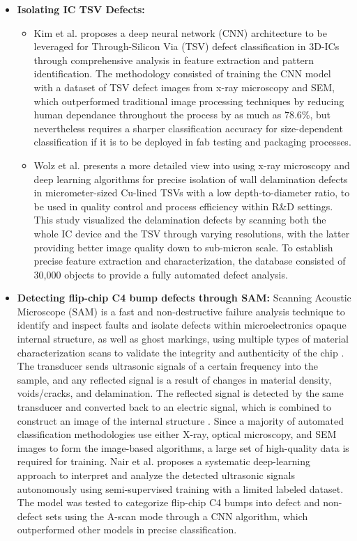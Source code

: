 \begin{itemize}
    \item \textbf{Isolating IC TSV Defects:}
    \begin{itemize}
    \item Kim et al. \cite{Kim2018DeepLB} proposes a deep neural network (CNN) architecture to be leveraged for Through-Silicon Via (TSV) defect classification in 3D-ICs through comprehensive analysis in feature extraction and pattern identification. The methodology consisted of training the CNN model with a dataset of TSV defect images from x-ray microscopy and SEM, which outperformed traditional image processing techniques by reducing human dependance throughout the process by as much as 78.6\%, but nevertheless requires a sharper classification accuracy for size-dependent classification if it is to be deployed in fab testing and packaging processes.
    \item Wolz et al. \cite{Wolz2022XrayMA} presents a more detailed view into using x-ray microscopy and deep learning algorithms for precise isolation of wall delamination defects in micrometer-sized Cu-lined TSVs with a low depth-to-diameter ratio, to be used in quality control and process efficiency within R\&D settings. This study visualized the delamination defects by scanning both the whole IC device and the TSV through varying resolutions, with the latter providing better image quality down to sub-micron scale. To establish precise feature extraction and characterization, the database consisted of 30,000 objects to provide a fully automated defect analysis.
    \end{itemize}    

    \item \textbf{Detecting flip-chip C4 bump defects through SAM:}
    Scanning Acoustic Microscope (SAM) is a fast and non-destructive failure analysis technique to identify and inspect faults and isolate defects within microelectronics opaque internal structure, as well as ghost markings, using multiple types of material characterization scans to validate the integrity and authenticity of the chip \cite{Johnson2021-qd}. The transducer sends ultrasonic signals of a certain frequency into the sample, and any reflected signal is a result of changes in material density, voids/cracks, and delamination. The reflected signal is detected by the same transducer and converted back to an electric signal, which is combined to construct an image of the internal structure \cite{YazdanMehr2015AnOO}. Since a majority of automated classification methodologies use either X-ray, optical microscopy, and SEM images to form the image-based algorithms, a large set of high-quality data is required for training. Nair et al. \cite{Nair2022AutomatedDC} proposes a systematic deep-learning approach to interpret and analyze the detected ultrasonic signals autonomously using semi-supervised training with a limited labeled dataset. The model was tested to categorize flip-chip C4 bumps into defect and non-defect sets using the A-scan mode through a CNN algorithm, which outperformed other models in precise classification. 
    

\end{itemize}
